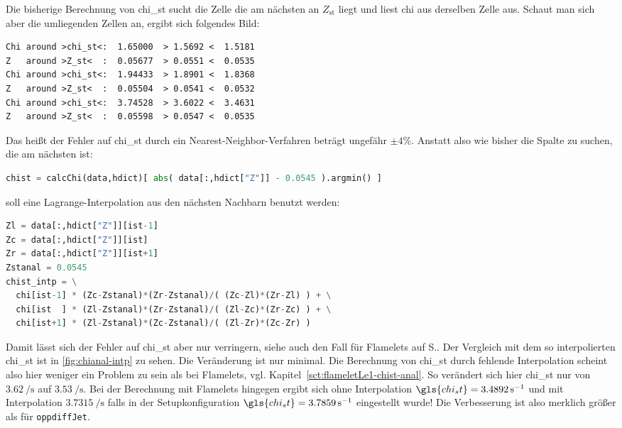 Die bisherige Berechnung von \gls{chi_st} sucht die Zelle die am nächsten an $Z_\mathrm{st}$ liegt und liest \gls{chi} aus derselben Zelle aus. Schaut man sich aber die umliegenden Zellen an, ergibt sich folgendes Bild:
\begin{lstlisting}
Chi around >chi_st<:  1.65000  > 1.5692 <  1.5181
Z   around >Z_st<  :  0.05677  > 0.0551 <  0.0535
Chi around >chi_st<:  1.94433  > 1.8901 <  1.8368
Z   around >Z_st<  :  0.05504  > 0.0541 <  0.0532
Chi around >chi_st<:  3.74528  > 3.6022 <  3.4631
Z   around >Z_st<  :  0.05598  > 0.0547 <  0.0535
\end{lstlisting}\vspace{-2\baselineskip}
Das heißt der Fehler auf \gls{chi_st} durch ein Nearest-Neighbor-Verfahren beträgt ungefähr $\pm 4\%$. Anstatt also wie bisher die Spalte zu suchen, die am nächsten ist:
\begin{lstlisting}[language=Python, label={lst:chist-naiv}, caption={Nächste-Nachbar-Interpolation für \gls{chi_st}}]
chist = calcChi(data,hdict)[ abs( data[:,hdict["Z"]] - 0.0545 ).argmin() ]
\end{lstlisting}
soll eine Lagrange-Interpolation aus den nächsten Nachbarn benutzt werden:
\begin{lstlisting}[language=Python]
Zl = data[:,hdict["Z"]][ist-1]
Zc = data[:,hdict["Z"]][ist]
Zr = data[:,hdict["Z"]][ist+1]
Zstanal = 0.0545
chist_intp = \
  chi[ist-1] * (Zc-Zstanal)*(Zr-Zstanal)/( (Zc-Zl)*(Zr-Zl) ) + \
  chi[ist  ] * (Zl-Zstanal)*(Zr-Zstanal)/( (Zl-Zc)*(Zr-Zc) ) + \
  chi[ist+1] * (Zl-Zstanal)*(Zc-Zstanal)/( (Zl-Zr)*(Zc-Zr) )
\end{lstlisting}\vspace{-2\baselineskip}
Damit lässt sich der Fehler auf \gls{chi_st} aber nur verringern, siehe auch den Fall für Flamelets auf S.\pageref{pg:chistproblem}. Der Vergleich mit dem so interpolierten \gls{chi_st} ist in \autoref{fig:chianal-intp} zu sehen. Die Veränderung ist nur minimal. Die Berechnung von \gls{chi_st} durch fehlende Interpolation scheint also hier weniger ein Problem zu sein als bei Flamelets, vgl. Kapitel~\ref{sct:flameletLe1-chist-anal}. So verändert sich hier \gls{chi_st} nur von $\SI{3.62}{\per\second}$ auf $\SI{3.53}{\per\second}$. Bei der Berechnung mit Flamelets hingegen ergibt sich ohne Interpolation $\gls{chi_st}=\SI{3.4892}{\per\second}$ und mit Interpolation $\SI{3.7315}{\per\second}$ falls in der Setupkonfiguration $\gls{chi_st}=\SI{3.7859}{\per\second}$ eingestellt wurde! Die Verbesserung ist also merklich größer als für \lstinline!oppdiffJet!.

